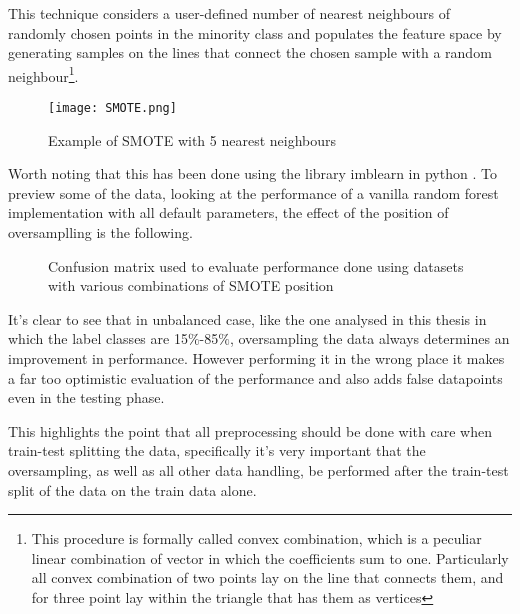 This technique considers a user-defined number of nearest neighbours of randomly chosen points in the minority class and populates the feature space by generating samples on the lines that connect the chosen sample with a random neighbour\footnote{This procedure is formally called convex combination, which is a peculiar linear combination of vector in which the coefficients sum to one. Particularly all convex combination of two points lay on the line that connects them, and for three point lay within the triangle that has them as vertices}.


\begin{figure}[H]
		\centering
  		\texttt{[image: SMOTE.png]}
        \caption{Example of SMOTE with 5 nearest neighbours}
\end{figure}

Worth noting that this has been done using the library imblearn in python \cite{imblearn}. To preview some of the data, looking at the performance of a vanilla random forest implementation with all default parameters, the effect of the position of oversamplling is the following.


\begin{figure}[H]
\centering
\centering \newline
    \caption{Confusion matrix used to evaluate performance done using datasets with various combinations of SMOTE position}\label{fig:smote_after}
\end{figure}

It's clear to see that in unbalanced case, like the one analysed in this thesis in which the label classes are 15$\%$-85$\%$, oversampling the data always determines an improvement in performance. However performing it in the wrong place it makes a far too optimistic evaluation of the performance and also adds false datapoints even in the testing phase. 

This highlights the point that all preprocessing should be done with care when train-test splitting the data, specifically it's very important that the oversampling, as well as all other data handling, be performed after the train-test split of the data on the train data alone. 

